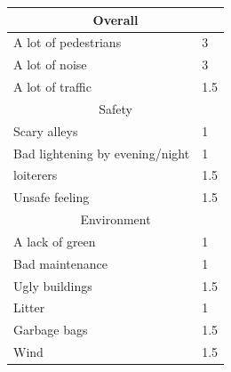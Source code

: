 \begin{appendix}
\begin{table}[ht]
\begin{tabular}{|l|l|}
	\multicolumn{2}{|c|}{Overall} \\
	\hline   
	A lot of pedestrians & 3 \\
	A lot of noise & 3 \\
	A lot of traffic & 1.5 \\
	\hline
	\multicolumn{2}{|c|}{Safety} \\
	\hline
	Scary alleys & 1 \\
	Bad lightening by evening/night & 1 \\
	loiterers & 1.5 \\
	Unsafe feeling & 1.5 \\
	\hline
	\multicolumn{2}{|c|}{Environment} \\
	\hline 
	A lack of green & 1 \\
	Bad maintenance & 1 \\
	Ugly buildings & 1.5 \\
	Litter & 1 \\
	Garbage bags & 1.5 \\
	Wind & 1.5 \\
	\hline
\end{tabular}
\end{table}

\clearpage


\end{appendix}
